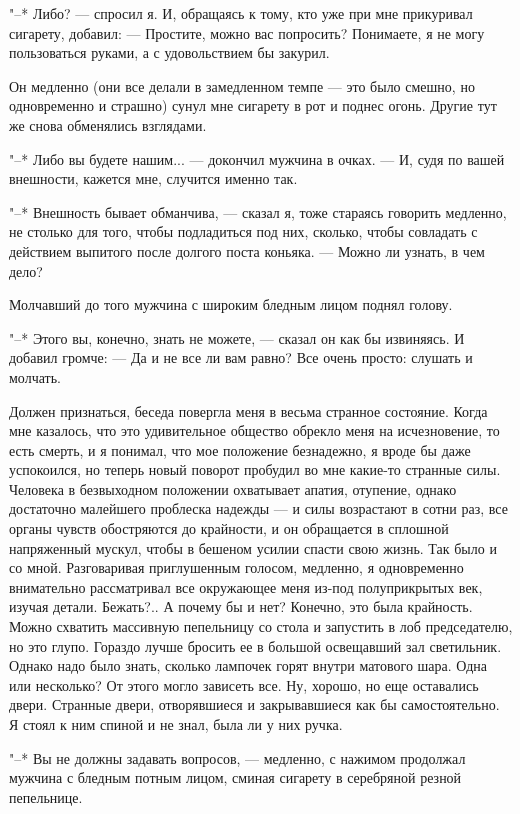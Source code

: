 "--* Либо? --- спросил я. И, обращаясь к тому, кто уже  при  мне  прикуривал
сигарету, добавил: --- Простите, можно вас попросить? Понимаете, я  не  могу
пользоваться руками, а с удовольствием бы закурил.

Он медленно (они все делали в замедленном темпе --- это было  смешно,  но
одновременно и страшно) сунул мне сигарету в рот и  поднес  огонь.  Другие
тут же снова обменялись взглядами.

"--* Либо вы будете нашим... --- докончил мужчина в  очках.  ---  И,  судя  по
вашей внешности, кажется мне, случится именно так.

"--* Внешность бывает  обманчива,  ---  сказал  я,  тоже  стараясь  говорить
медленно, не столько для того, чтобы подладиться под них,  сколько,  чтобы
совладать с действием выпитого после долгого поста  коньяка.  ---  Можно  ли
узнать, в чем дело?

Молчавший до того мужчина с широким бледным лицом поднял голову.

"--* Этого вы, конечно, знать не можете, --- сказал он как бы  извиняясь.  И
добавил громче: --- Да и не все ли вам равно? Все очень  просто:  слушать  и
молчать.

Должен признаться, беседа повергла меня в  весьма  странное  состояние.
Когда  мне  казалось,  что  это  удивительное  общество  обрекло  меня  на
исчезновение, то есть смерть, и я понимал, что мое положение безнадежно, я
вроде бы даже успокоился, но теперь новый поворот пробудил во мне какие-то
странные  силы.  Человека  в  безвыходном  положении  охватывает   апатия,
отупение,  однако  достаточно  малейшего  проблеска  надежды  ---   и   силы
возрастают в сотни раз, все органы чувств обостряются до крайности,  и  он
обращается в сплошной напряженный мускул, чтобы в  бешеном  усилии  спасти
свою жизнь.  Так  было  и  со  мной.  Разговаривая  приглушенным  голосом,
медленно, я одновременно  внимательно  рассматривал  все  окружающее  меня
из-под полуприкрытых век, изучая детали. Бежать?..  А  почему  бы  и  нет?
Конечно, это была крайность. Можно схватить массивную пепельницу со  стола
и запустить в лоб председателю, но это глупо. Гораздо лучше бросить  ее  в
большой  освещавший  зал  светильник.  Однако  надо  было  знать,  сколько
лампочек горят внутри матового шара. Одна или несколько?  От  этого  могло
зависеть все.  Ну,  хорошо,  но  еще  оставались  двери.  Странные  двери,
отворявшиеся и закрывавшиеся как бы самостоятельно. Я стоял к ним спиной и
не знал, была ли у них ручка.

"--* Вы не должны задавать  вопросов,  ---  медленно,  с  нажимом  продолжал
мужчина с бледным  потным  лицом,  сминая  сигарету  в  серебряной  резной
пепельнице.

